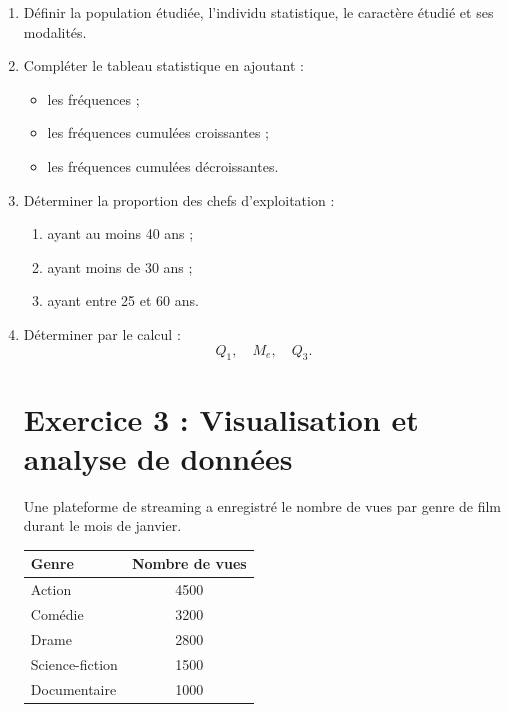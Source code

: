 \documentclass[12pt,a4paper]{article}
\begin{document}
\begin{enumerate}
\item Définir la population étudiée, l'individu statistique, le caractère étudié et ses modalités.
\item Compléter le tableau statistique en ajoutant :
\begin{itemize}
\item les fréquences ;
\item les fréquences cumulées croissantes ;
\item les fréquences cumulées décroissantes.
\end{itemize}
\item Déterminer la proportion des chefs d'exploitation :
\begin{enumerate}
\item ayant au moins 40 ans ;
\item ayant moins de 30 ans ;
\item ayant entre 25 et 60 ans.
\end{enumerate}
\item Déterminer par le calcul :
\[
Q_1,\quad M_e,\quad Q_3.
\]

\section*{Exercice 3 : Visualisation et analyse de données}

Une plateforme de streaming a enregistré le nombre de vues par genre de film durant le mois de janvier.

\begin{center}
\begin{tabular}{|l|c|}
\hline
\textbf{Genre} & \textbf{Nombre de vues} \\
\hline
Action & 4500 \\
Comédie & 3200 \\
Drame & 2800 \\
Science-fiction & 1500 \\
Documentaire & 1000 \\
\hline
\end{tabular}
\end{center}


\end{enumerate}
\end{document}
